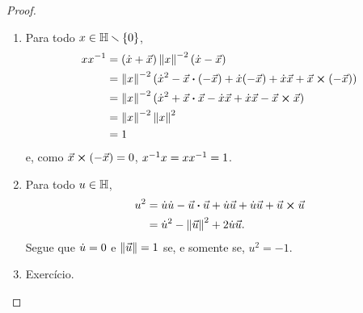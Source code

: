 \begin{proof}
\begin{enumerate}
	\item Para todo $x \in \mathbb{H} \smallsetminus \{0\}$,
	\begin{align*}
	xx^{-1} &= (\dot{x}+\vec{x})\left\Vert{x}\right\Vert^{-2}(\dot{x}-\vec{x}) \\
		&= \left\Vert{x}\right\Vert^{-2}(\dot{x}^2-{\vec{x}} \bm{\cdot} {(-\vec{x})}+\dot{x}(-\vec{x})+\dot{x}\vec{x}+{\vec{x}} \bm{\times} {(-\vec{x})}) \\
		&= \left\Vert{x}\right\Vert^{-2}(\dot{x}^2+{\vec{x}} \bm{\cdot} {\vec{x}}-\dot{x}\vec{x}+\dot{x}\vec{x}-{\vec{x}} \bm{\times} {\vec{x}}) \\
		&= \left\Vert{x}\right\Vert^{-2}\left\Vert{x}\right\Vert^2 \\
		&= 1
	\end{align*}
e, como ${\vec{x}} \bm{\times} {(-\vec{x})} = 0$, $x^{-1} x = xx^{-1} = 1$.

	\item Para todo $u \in \mathbb{H}$,
		\begin{align*}
		u^2 &= \dot{u}\dot{u} - {\vec{u}} \bm{\cdot} {\vec{u}}+\dot{u}\vec{u}+\dot{u}\vec{u}+{\vec{u}} \bm{\times} {\vec{u}} \\
			&=  \dot{u}^2 - \left\Vert{\vec{u}}\right\Vert^2 + 2\dot{u}\vec{u}.
		\end{align*}
Segue que $\dot{u}=0$ e $\left\Vert{\vec{u}}\right\Vert=1$ se, e somente se, $u^2=-1$.
	
	\item Exercício.
\end{enumerate}
\end{proof}



